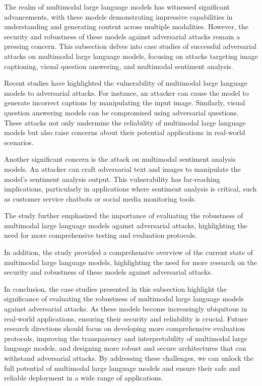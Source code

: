 \documentclass[11pt,a4paper]{article}
\begin{document}
The realm of multimodal large language models has witnessed significant advancements, with these models demonstrating impressive capabilities in understanding and generating content across multiple modalities. However, the security and robustness of these models against adversarial attacks remain a pressing concern. This subsection delves into case studies of successful adversarial attacks on multimodal large language models, focusing on attacks targeting image captioning, visual question answering, and multimodal sentiment analysis.

Recent studies have highlighted the vulnerability of multimodal large language models to adversarial attacks. For instance, an attacker can cause the model to generate incorrect captions by manipulating the input image. Similarly, visual question answering models can be compromised using adversarial questions. These attacks not only undermine the reliability of multimodal large language models but also raise concerns about their potential applications in real-world scenarios.

Another significant concern is the attack on multimodal sentiment analysis models. An attacker can craft adversarial text and images to manipulate the model's sentiment analysis output. This vulnerability has far-reaching implications, particularly in applications where sentiment analysis is critical, such as customer service chatbots or social media monitoring tools. 

The \cite{arxiv:2306.09093} study further emphasized the importance of evaluating the robustness of multimodal large language models against adversarial attacks, highlighting the need for more comprehensive testing and evaluation protocols.

In addition, the \cite{arxiv:2409.18991} study provided a comprehensive overview of the current state of multimodal large language models, highlighting the need for more research on the security and robustness of these models against adversarial attacks.

In conclusion, the case studies presented in this subsection highlight the significance of evaluating the robustness of multimodal large language models against adversarial attacks. As these models become increasingly ubiquitous in real-world applications, ensuring their security and reliability is crucial. Future research directions should focus on developing more comprehensive evaluation protocols, improving the transparency and interpretability of multimodal large language models, and designing more robust and secure architectures that can withstand adversarial attacks. By addressing these challenges, we can unlock the full potential of multimodal large language models and ensure their safe and reliable deployment in a wide range of applications.
\end{document}
